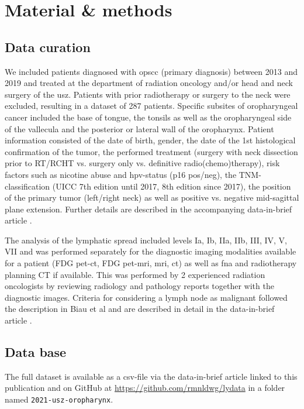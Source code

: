 \documentclass[\relativeRoot/main.tex]{subfiles}
\begin{document}
\section{Material \& methods}
\label{sec:dataset:material}

\subsection*{Data curation}

We included patients diagnosed with \gls{opscc} (primary diagnosis) between 2013 and 2019 and treated at the department of radiation oncology and/or head and neck surgery of the \gls{usz}. Patients with prior radiotherapy or surgery to the neck were excluded, resulting in a dataset of 287 patients. Specific subsites of oropharyngeal cancer included the base of tongue, the tonsils as well as the oropharyngeal side of the vallecula and the posterior or lateral wall of the oropharynx. Patient information consisted of the date of birth, gender, the date of the 1st histological confirmation of the tumor, the performed treatment (surgery with neck dissection prior to RT/RCHT vs. surgery only vs. definitive radio(chemo)therapy), risk factors such as nicotine abuse and \gls{hpv}-status (p16 pos/neg), the TNM-classification (UICC 7th edition until 2017, 8th edition since 2017), the position of the primary tumor (left/right neck) as well as positive vs. negative mid-sagittal plane extension. Further details are described in the accompanying data-in-brief article \cite{ludwig_dataset_2021}.

The analysis of the lymphatic spread included levels Ia, Ib, IIa, IIb, III, IV, V, VII and was performed separately for the diagnostic imaging modalities available for a patient (FDG \gls{pet}-\gls{ct}, FDG \gls{pet}-\gls{mri}, \gls{mri}, \gls{ct}) as well as \gls{fna} and radiotherapy planning CT if available. This was performed by 2 experienced radiation oncologists by reviewing radiology and pathology reports together with the diagnostic images. Criteria for considering a lymph node as malignant followed the description in Biau et al \cite{biau_selection_2019} and are described in detail in the data-in-brief article \cite{ludwig_dataset_2021}.

\subsection*{Data base}

The full dataset is available as a \gls{csv}-file via the data-in-brief article linked to this publication \cite{ludwig_dataset_2021} and on GitHub at \url{https://github.com/rmnldwg/lydata} in a folder named \verb|2021-usz-oropharynx|.
\end{document}
